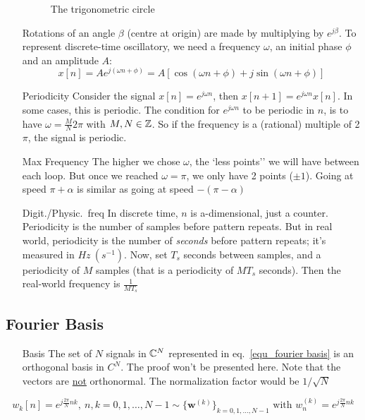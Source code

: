 \documentclass[11pt,a4paper]{article}
\begin{document}
\begin{itemize}
\begin{figure}
		      \caption{The trigonometric circle}%
		      \label{fig_trigo circle}
	      \end{figure}
	      Rotations of an angle $\beta$ (centre at origin) are made by multiplying by $e^{j\beta}$. To represent discrete-time oscillatory, we need a frequency $\omega$, an initial phase $\phi$ and an amplitude $A$:
	      \[x[n] = Ae^{j(\omega n + \phi)} = A[\cos(\omega n + \phi) + j\sin(\omega n+ \phi)]\]
	\item[Periodicity] Consider the signal $x[n] = e^{j\omega n}$, then $x[n+1] = e^{j\omega n} x[n]$. In some cases, this is periodic. The condition for $e^{j\omega n}$ to be periodic in $n$, is to have $\omega = \frac{M}{N}2\pi$ with $M,N \in \mathbb{Z}$. So if the frequency is a (rational) multiple of 2$\pi$, the signal is periodic.
	\item[Max Frequency]The higher we chose $\omega$, the `less points'' we will have between each loop. But once we reached $\omega = \pi$, we only have 2 points ($\pm 1$). Going at speed $\pi+\alpha$ is similar as going at speed $-(\pi-\alpha)$
	\item[Digit./Physic.\ freq]In discrete time, $n$ is a-dimensional, just a counter. Periodicity is the number of samples before pattern repeats. But in real world, periodicity is the number of \textit{seconds} before pattern repeats; it's measured in $Hz\ (s^{-1})$. Now, set $T_s$ seconds between samples, and a periodicity of $M$ samples (that is a periodicity of $MT_s$ seconds). Then the real-world frequency is $\frac{1}{MT_s}$
\end{itemize}
\subsection{Fourier Basis}
\begin{itemize}
	\item[Basis]The set of $N$ signals in $\mathbb{C}^N$ represented in eq.~\ref{equ_fourier basis} is an orthogonal basis in $C^N$. The proof won't be presented here. Note that the vectors are \uline{not} orthonormal. The normalization factor would be $1/\sqrt{N}$
\end{itemize}
\begin{equation}
	w_k[n] = e^{j\frac{2\pi}{N}nk},\ n,k = 0,1,\ldots,N-1 \sim \{\mathbf{w}^{(k)}\}_{k=0,1,\ldots,N-1} \text{ with } w_n^{(k)} = e^{j\frac{2\pi}{N}nk}
	\label{equ_fourier basis}
\end{equation}
\end{document}
